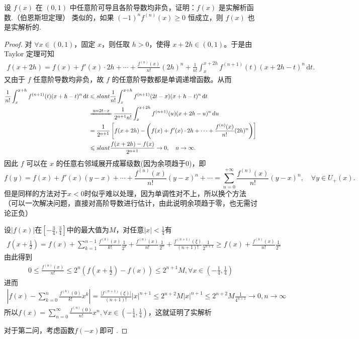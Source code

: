 \documentclass[../../main.tex]{subfiles}
\begin{document}
\begin{example}
设 \( f(x) \) 在 \( (0,1) \) 中任意阶可导且各阶导数均非负，证明：\( f(x) \) 是实解析函数.（伯恩斯坦定理） 
类似的，如果 \( (-1)^n f^{(n)}(x) \geqslant  0 \) 恒成立，则 \( f(x) \) 也是实解析的. 
\end{example}
\begin{proof}
对 \(\forall x \in (0,1)\)，固定 \(x\)，则任取 \(h>0\)，使得 \(x+2h \in (0,1)\)。于是由 Taylor 定理可知
\begin{align*}
f(x+2h) = f(x) + f'(x) \cdot 2h + \cdots + \frac{f^{(n)}(x)}{n!} (2h)^n + \frac{1}{n!} \int_x^{x+2h} f^{(n+1)}(t) (x+2h-t)^n \, \mathrm{d}t.
\end{align*}
又由于 \(f\) 任意阶导数均非负，故 \(f\) 的任意阶导数都是单调递增函数。从而
\begin{align*}
\frac{1}{n!} \int_x^{x+h} f^{(n+1)}(t) (x+h-t)^n \, \mathrm{d}t &\leqslant slant \frac{1}{n!} \int_x^{x+h} f^{(n+1)}(2t-x) (x+h-t)^n \, \mathrm{d}t \\
&\xlongequal{u=2t-x} \frac{1}{2^{n+1} n!} \int_x^{x+2h} f^{(n+1)}(u) (x+2h-u)^n \, \mathrm{d}u \\
&= \frac{1}{2^{n+1}} \left[ f(x+2h) - \left( f(x) + f'(x) \cdot 2h + \cdots + \frac{f^{(n)}(x)}{n!} (2h)^n \right) \right] \\
&\leqslant slant \frac{f(x+2h) - f(x)}{2^{n+1}} \to 0, \quad n \to \infty.
\end{align*}
因此 \(f\) 可以在 \(x\) 的任意右邻域展开成幂级数(因为余项趋于0)，即
\[
f(y) = f(x) + f'(x) (y-x) + \cdots + \frac{f^{(n)}(x)}{n!} (y-x)^n + \cdots = \sum_{n=0}^{+\infty} \frac{f^{(n)}(x)}{n!} (y-x)^n, \quad \forall y \in U_+(x).
\]
但是同样的方法对于\(x < 0\)时似乎难以处理，因为单调性对不上，所以换个方法（可以一次解决问题，直接对高阶导数进行估计，由此说明余项趋于零，也无需讨论正负）

设\(\vert f(x)\vert\)在\([-\frac{3}{4},\frac{3}{4}]\)中的最大值为\(M\)，对任意\(\vert x\vert<\frac{1}{4}\)有
\begin{align*}
f\left(x + \frac{1}{2}\right)=f(x)+\sum_{k = 1}^{n - 1}\frac{f^{(k)}(x)}{k!}\frac{1}{2^{k}}+\frac{f^{(n)}(x)}{n!}\frac{1}{2^{n}}+\frac{f^{(n + 1)}(\xi)}{(n + 1)!}\frac{1}{2^{n + 1}}\geqslant  f(x)+\frac{f^{(n)}(x)}{n!}\frac{1}{2^{n}}
\end{align*}
由此得到
\begin{align*}
0\leqslant \frac{f^{(n)}(x)}{n!}\leqslant  2^{n}\left(f\left(x+\frac{1}{2}\right)-f(x)\right)\leqslant  2^{n + 1}M,\forall x\in\left(-\frac{1}{4},\frac{1}{4}\right)
\end{align*}
进而
\begin{align*}
\left\vert f(x)-\sum_{k = 0}^{n}\frac{f^{(k)}(0)}{k!}x^{k}\right\vert=\frac{\vert f^{(n + 1)}(\xi)\vert}{(n + 1)!}\vert x\vert^{n + 1}\leqslant  2^{n + 2}M\vert x\vert^{n + 1}\leqslant  2^{n + 2}M\frac{1}{4^{n + 1}}\to 0,n\to\infty
\end{align*}
所以\(f(x)=\sum_{n = 0}^{\infty}\frac{f^{(n)}(0)}{n!}x^{n},\forall x\in\left(-\frac{1}{4},\frac{1}{4}\right)\)，这就证明了实解析

对于第二问，考虑函数\(f(-x)\)即可 .
\end{proof}
\end{document}
